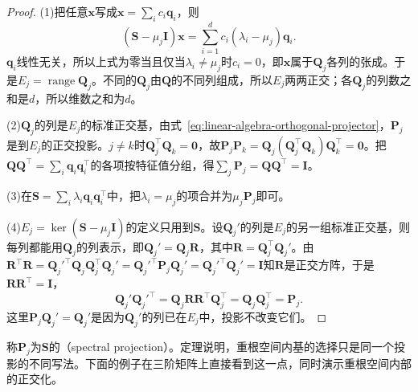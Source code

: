 \begin{proof}
(1)把任意$\bm x$写成$\bm x=\sum_ic_i\bm q_i$，则
\[
 (\bm S-\mu_j\bm I)\bm x=\sum_{i=1}^d c_i(\lambda_i-\mu_j)\bm q_i .
\]
$\bm q_i$线性无关，所以上式为零当且仅当$\lambda_i\neq\mu_j$时$c_i=0$，即$\bm x$属于$\bm Q_j$各列的张成。于是$E_j=\operatorname{range}\bm Q_j$。不同的$\bm Q_j$由$\bm Q$的不同列组成，所以$E_j$两两正交；各$\bm Q_j$的列数之和是$d$，所以维数之和为$d$。

(2)$\bm Q_j$的列是$E_j$的标准正交基，由式~\eqref{eq:linear-algebra-orthogonal-projector}，$\bm P_j$是到$E_j$的正交投影。$j\neq k$时$\bm Q_j^\top\bm Q_k=\bm0$，故$\bm P_j\bm P_k=\bm Q_j(\bm Q_j^\top\bm Q_k)\bm Q_k^\top=\bm0$。把$\bm Q\bm Q^\top=\sum_i\bm q_i\bm q_i^\top$的各项按特征值分组，得$\sum_j\bm P_j=\bm Q\bm Q^\top=\bm I$。

(3)在$\bm S=\sum_i\lambda_i\bm q_i\bm q_i^\top$中，把$\lambda_i=\mu_j$的项合并为$\mu_j\bm P_j$即可。

(4)$E_j=\ker(\bm S-\mu_j\bm I)$的定义只用到$\bm S$。设$\bm Q_j'$的列是$E_j$的另一组标准正交基，则每列都能用$\bm Q_j$的列表示，即$\bm Q_j'=\bm Q_j\bm R$，其中$\bm R=\bm Q_j^\top\bm Q_j'$。由$\bm R^\top\bm R=\bm Q_j'^\top\bm Q_j\bm Q_j^\top\bm Q_j'=\bm Q_j'^\top\bm P_j\bm Q_j'=\bm Q_j'^\top\bm Q_j'=\bm I$知$\bm R$是正交方阵，于是$\bm R\bm R^\top=\bm I$，
\[
 \bm Q_j'\bm Q_j'^\top=\bm Q_j\bm R\bm R^\top\bm Q_j^\top=\bm Q_j\bm Q_j^\top=\bm P_j .
\]
这里$\bm P_j\bm Q_j'=\bm Q_j'$是因为$\bm Q_j'$的列已在$E_j$中，投影不改变它们。
\end{proof}

称$\bm P_j$为$\bm S$的（spectral projection）。定理说明，重根空间内基的选择只是同一个投影的不同写法。下面的例子在三阶矩阵上直接看到这一点，同时演示重根空间内部的正交化。


